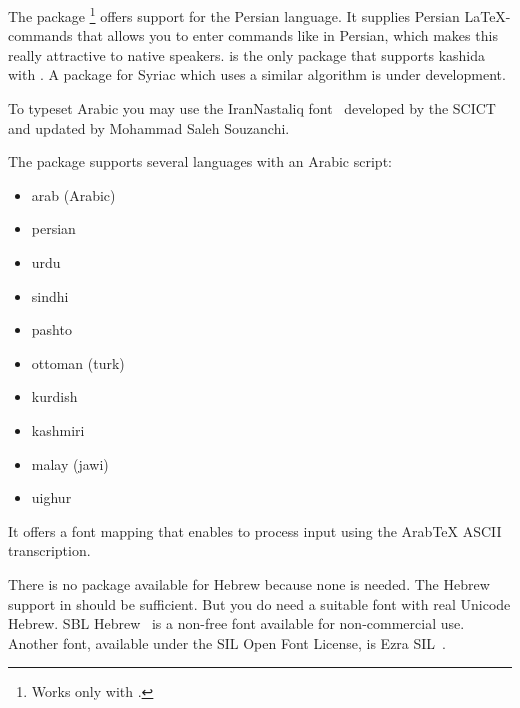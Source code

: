 
The package \footnote{Works only with
  .} offers support for the Persian language. It
supplies Persian \LaTeX-commands that allows you to enter commands like
 in Persian, which makes this really attractive to native speakers.
 is the only package that supports kashida with
. A package for Syriac which uses a similar algorithm is under
development.

To typeset Arabic you may use the IranNastaliq font~\cite{font:IranNastaliq}
developed by the SCICT and updated by Mohammad Saleh Souzanchi.

The  package supports several languages with
an Arabic script:
\begin{itemize}
  \item arab (Arabic)
  \item persian
  \item urdu
  \item sindhi
  \item pashto
  \item ottoman (turk)
  \item kurdish
  \item kashmiri
  \item malay (jawi)
  \item uighur
\end{itemize}

It offers a font mapping that enables  to process input
using the Arab\TeX{} ASCII transcription.

There is no package available for Hebrew because none is needed.
The Hebrew support in  should be sufficient. But you do need a
suitable font with real Unicode Hebrew. SBL Hebrew~\cite{font:sblhebrew} is a
non-free font available for non-commercial use. Another font, available under
the SIL Open Font License, is Ezra SIL~\cite{font:ezrasil}.


